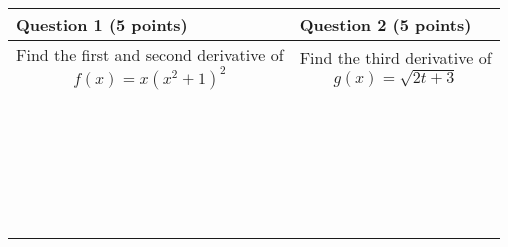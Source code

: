 \documentclass[11pt,letterpaper]{exam}
\begin{document}









\begin{tabularx}{\textwidth}{X|X}
  \textbf{Question 1} (5 points) & \textbf{Question 2} (5 points) \\
\hline
Find the first and second derivative of
$$
f(x) = x(x^2+1)^2
$$

\vfill
&

Find the third derivative of
$$
g(x) = \sqrt{2t+3}
$$

\\
\\
\\
\\
\\
\\
\\
\\
\\
\\
\\
\\
\\
\\
\\
\\
\\
\\
\\
\\
\\
\\
\\
\\
\\




\end{tabularx}
\vspace{.5in}
\end{document}
